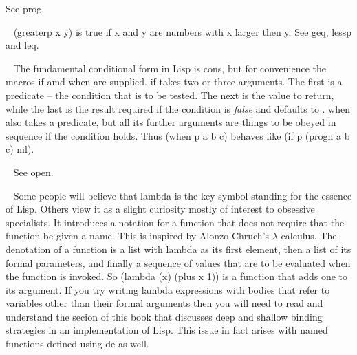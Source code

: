 \begin{description}
See {\tx prog}.
\item[{\tx greaterp~~~~~} \hspace{1cm} {\em function 2 args}]~\newline
{\tx (greaterp x y)} is true if {\tx x} and {\tx y} are numbers with
{\tx x} larger then {\tx y}. See {\tx geq}, {\tx lessp} and {\tx leq}.
\item[{\tx if~~~~~~~~~~~} \hspace{1cm} {\em macro}]~\newline
The fundamental conditional form in Lisp is {\tx cons}, but for convenience
the macros {\tx if} amd {\tx when} are supplied. {\tx if} takes two
or three arguments. The first is a predicate -- the condition that
is to be tested. The next is the value to return, while the last is the
result required if the condition is {\em false} and defaults to \nil.
{\tx when} also takes a predicate, but all its further arguments are things
to be obeyed in sequence if the condition holds. Thus
{\tx (when p a b c)} behaves like {\tx (if p (progn a b c) nil)}.
\item[{\tx input~~~~~~~~} \hspace{1cm} {\em symbol}]~\newline
See {\tx open}.
\item[{\tx lambda~~~~~~~} \hspace{1cm} {\em symbol}]~\newline
Some people will believe that {\tx lambda} is the key symbol standing for the
essence of Lisp. Others view it as a slight curiosity mostly of interest
to obsessive specialists. It introduces a notation for a function that does
not require that the function be given a name. This is inspired by
Alonzo Chruch's $\lambda$-calculus. The denotation of a function is a list
with {\tx lambda} as its first element, then a list of its formal parameters,
and finally a sequence of values that are to be evaluated when the function
is invoked. So {\tx (lambda (x) (plus x 1))} is a function that adds one to
its argument. If you try writing lambda expressions with bodies that refer to
variables other than their formal arguments then you will need to read
and understand the secion of this book that discusses deep and shallow
binding strategies in an implementation of Lisp. This issue in fact arises
with named functions defined using {\tx de} as well.
\item[{\tx last~~~~~~~~~} \hspace{1cm} {\em function 1 arg}]~\newline

\end{description}
